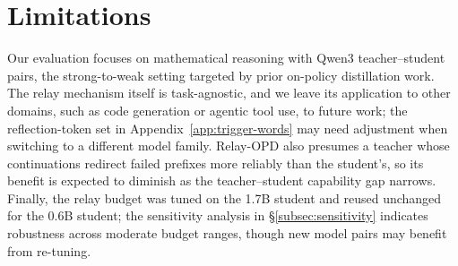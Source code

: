 \documentclass{article} %
\begin{document}
\section{Limitations}\label{app:limitations}

Our evaluation focuses on mathematical reasoning with Qwen3 teacher--student pairs, the strong-to-weak setting targeted by prior on-policy distillation work. The relay mechanism itself is task-agnostic, and we leave its application to other domains, such as code generation or agentic tool use, to future work; the reflection-token set in Appendix~\ref{app:trigger-words} may need adjustment when switching to a different model family. Relay-OPD also presumes a teacher whose continuations redirect failed prefixes more reliably than the student's, so its benefit is expected to diminish as the teacher--student capability gap narrows. Finally, the relay budget was tuned on the 1.7B student and reused unchanged for the 0.6B student; the sensitivity analysis in \S\ref{subsec:sensitivity} indicates robustness across moderate budget ranges, though new model pairs may benefit from re-tuning.\par
\end{document}
